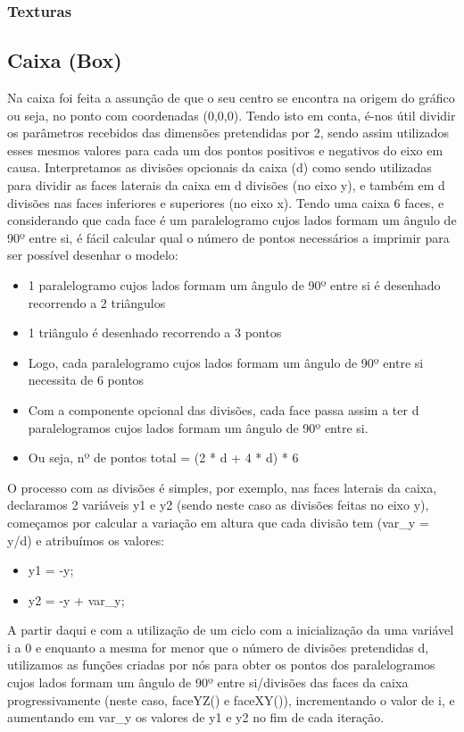\documentclass{article}
\begin{document}
\subsubsection{Texturas}

\subsection{Caixa (Box)}

Na caixa foi feita a assunção de que o seu centro se encontra na origem do gráfico ou seja, no ponto com coordenadas (0,0,0).
Tendo isto em conta, é-nos útil dividir os parâmetros recebidos das dimensões pretendidas por 2, sendo assim utilizados esses mesmos valores para cada um dos pontos positivos e negativos do eixo em causa.
Interpretamos as divisões opcionais da caixa (d) como sendo utilizadas para dividir as faces laterais da caixa em d divisões (no eixo y), e também em d divisões nas faces inferiores e superiores (no eixo x).
Tendo uma caixa 6 faces, e considerando que cada face é um paralelogramo cujos lados formam um ângulo de 90º entre si, é fácil calcular qual o número de pontos necessários a imprimir para ser possível desenhar o modelo:
\begin{itemize}
    \item 1 paralelogramo cujos lados formam um ângulo de 90º entre si é desenhado recorrendo a 2 triângulos
    \item 1 triângulo é desenhado recorrendo a 3 pontos
    \item Logo, cada paralelogramo cujos lados formam um ângulo de 90º entre si necessita de 6 pontos
    \item Com a componente opcional das divisões, cada face passa assim a ter d paralelogramos cujos lados formam um ângulo de 90º entre si.
    \item Ou seja, nº de pontos total = (2 * d + 4 * d) * 6
\end{itemize}
O processo com as divisões é simples, por exemplo, nas faces laterais da caixa, declaramos 2 variáveis y1 e y2 (sendo neste caso as divisões feitas no eixo y), começamos por calcular a variação em altura que cada divisão tem (var\_y = y/d) e atribuímos os valores:
\begin{itemize}
    \item y1 = -y;
    \item y2 = -y + var\_y;
\end{itemize}
A partir daqui e com a utilização de um ciclo com a inicialização da uma variável i a 0 e enquanto a mesma for menor que o número de divisões pretendidas d, utilizamos as funções criadas por nós para obter os pontos dos paralelogramos cujos lados formam um ângulo de 90º entre si/divisões das faces da caixa progressivamente (neste caso, faceYZ() e faceXY()), incrementando o valor de i, e aumentando em var\_y os valores de y1 e y2 no fim de cada iteração.
\end{document}
